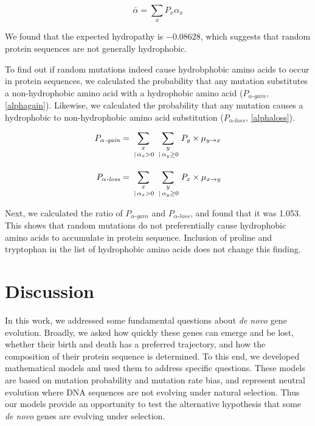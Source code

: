 \documentclass[12pt,a4paper]{article}
\begin{document}
\begin{equation}
\bar{\alpha} = \sum_{x} P_x \alpha_x
\label{expHydropathy}
\end{equation}


We found that the expected hydropathy is $-0.08628$, which suggests that random protein sequences are not generally hydrophobic. 
 
To find out if random mutations indeed cause hydrobphobic amino acids to occur in protein sequences, we calculated the probability that any mutation substitutes a non-hydrophobic amino acid with a hydrophobic amino acid ($P_{\alpha\textit{-gain}}$, \autoref{alphagain}). Likewise, we calculated the probability that any mutation causes a hydrophobic to non-hydrophobic amino acid substitution ($P_{\alpha\textit{-loss}}$, \autoref{alphaloss}).  

\begin{align}
P_{\alpha\textit{-gain}} & = \sum_{\genfrac{}{}{0pt}{1}{x}{\,|\,\alpha_x>0}} \sum_{\genfrac{}{}{0pt}{1}{y}{\,|\,\alpha_y \geq 0}} P_y \times \mu_{y\to x}\label{alphagain}\\[1em]
%
P_{\alpha\textit{-loss}} &= \sum_{\genfrac{}{}{0pt}{1}{x}{\,|\,\alpha_x>0}} \sum_{\genfrac{}{}{0pt}{1}{y}{\,|\,\alpha_y \geq 0}} P_x \times \mu_{x\to y}\label{alphaloss}
\end{align}

Next, we calculated the ratio of $P_{\alpha\textit{-gain}}$ and $P_{\alpha\textit{-loss}}$, and found that it was 1.053. This shows that random mutations do not preferentially cause hydrophobic amino acids to accumulate in protein sequence. Inclusion of proline and tryptophan in the list of hydrophobic amino acids does not change this finding.

\section{Discussion} 

In this work, we addressed some fundamental questions about \textit{de novo} gene evolution. Broadly, we asked how quickly these genes can emerge and be lost, whether their birth and death has a preferred trajectory, and how the composition of their protein sequence is determined. To this end, we developed mathematical models and used them to address specific questions. These models are based on mutation probability and mutation rate bias, and represent neutral evolution where DNA sequences are not evolving under natural selection. Thus our models provide an opportunity to test the alternative hypothesis that some \textit{de novo} genes are evolving under selection.
\end{document}
